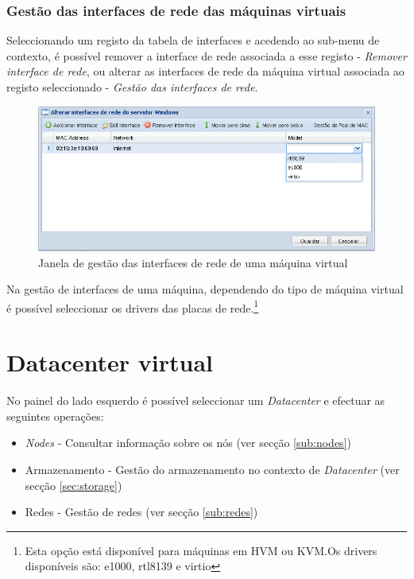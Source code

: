\subsubsection{Gestão das interfaces de rede das máquinas virtuais}
Seleccionando um registo da tabela de interfaces e acedendo ao sub-menu de contexto, é possível remover a interface de rede associada a esse registo - \emph{Remover interface de rede}, ou alterar as interfaces de rede da máquina virtual associada ao registo seleccionado - \emph{Gestão das interfaces de rede}.

\begin{figure}[H]
	\begin{center}
	\includegraphics[scale=0.5]{screenshots/nics.png}
	\caption{Janela de gestão das interfaces de rede de uma máquina virtual}
	\label{fig:nics}
	\end{center}
\end{figure}

Na gestão de interfaces de uma máquina, dependendo do tipo de máquina virtual é possível seleccionar os drivers das placas de rede.\footnote{Esta opção está disponível para máquinas em HVM ou KVM.Os drivers disponíveis são: e1000, rtl8139 e virtio}

\section{Datacenter virtual}
\label{sec:cluster}

No painel do lado esquerdo é possível seleccionar um \emph{Datacenter} e efectuar as seguintes operações:

\begin{itemize}
    \item \emph{Nodes} - Consultar informação sobre os nós (ver secção \ref{sub:nodes})
    \item Armazenamento - Gestão do armazenamento no contexto de \emph{Datacenter} (ver secção \ref{sec:storage})
    \item Redes - Gestão de redes (ver secção \ref{sub:redes})
\end{itemize}


